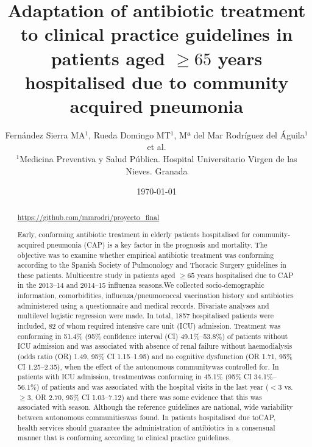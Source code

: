 \documentclass[11pt, a4paper]{article}
\begin{document}
\sffamily

\title{Adaptation of antibiotic treatment to clinical
practice guidelines in patients aged $\geq65$ years
hospitalised due to community acquired pneumonia}

\author{Fernández Sierra MA$^{1}$, Rueda Domingo MT$^{1}$, Mª del Mar Rodríguez del Águila$^{1}$ et al.\\
\small$^{1}$Medicina Preventiva y Salud Pública. Hospital Universitario Virgen de las Nieves. Granada}

\date{\today}

\maketitle


\begin{abstract}
\url{https://github.com/mmrodri/proyecto_final}

Early, conforming antibiotic treatment in elderly patients hospitalised for community-acquired pneumonia (CAP) is a key factor in the prognosis and mortality. The objective was to examine whether empirical antibiotic treatment was conforming according to the Spanish Society of Pulmonology and Thoracic Surgery guidelines in these patients. Multicentre study in patients aged $\geq65$ years hospitalised due to CAP in the 2013–14 and 2014–15 influenza seasons.We collected socio-demographic information, comorbidities, influenza/pneumococcal vaccination history and antibiotics administered using a questionnaire and medical records. Bivariate analyses and multilevel logistic regression were made. In total, 1857 hospitalised patients were included, 82 of whom required intensive care unit (ICU) admission. Treatment was conforming in 51.4\% (95\% confidence interval (CI) 49.1\%–53.8\%) of patients without ICU admission and was associated with absence of renal failure without haemodialysis (odds ratio (OR) 1.49, 95\% CI 1.15–1.95) and no cognitive dysfunction (OR 1.71, 95\% CI 1.25–2.35), when the effect of the autonomous communitywas controlled for. In patients with ICU admission, treatmentwas conforming in 45.1\% (95\% CI 34.1\%–56.1\%) of patients and was associated with the hospital visits in the last year ($<3$ vs. $\geq3$, OR 2.70, 95\% CI 1.03–7.12) and there was some evidence that this was associated with season. Although the reference guidelines are national, wide variability between autonomous communitieswas found. In patients hospitalised due toCAP, health services should guarantee the administration of antibiotics in a consensual manner that is conforming according to clinical practice guidelines.
\end{abstract}
\end{document}
